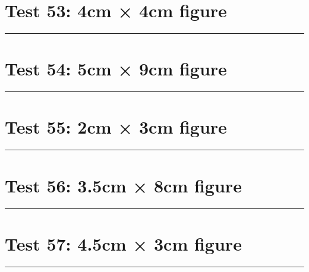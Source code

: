 \documentclass[a4paper,11pt]{article}
\begin{document}
\section*{Test 53: 4cm × 4cm figure}
\begin{swarmwrap}%
  \begin{minipage}[t]{4cm}
    \centering
    \rule{\linewidth}{4cm}
  \end{minipage}%
\end{swarmwrap}%
\swarmwrapnext
\lipsum[64]
\lipsum[65]
\lipsum[66]
\lipsum[67]
\lipsum[68]
\lipsum[69]
\section*{Test 54: 5cm × 9cm figure}
\begin{swarmwrap}%
  \begin{minipage}[t]{5cm}
    \centering
    \rule{\linewidth}{9cm}
  \end{minipage}%
\end{swarmwrap}%
\swarmwrapnext
\lipsum[50]
\lipsum[51]
\lipsum[52]
\lipsum[53]
\lipsum[54]
\lipsum[55]
\section*{Test 55: 2cm × 3cm figure}
\begin{swarmwrap}%
  \begin{minipage}[t]{2cm}
    \centering
    \rule{\linewidth}{3cm}
  \end{minipage}%
\end{swarmwrap}%
\swarmwrapnext
\lipsum[92]
\lipsum[93]
\lipsum[94]
\lipsum[95]
\lipsum[96]
\lipsum[97]
\section*{Test 56: 3.5cm × 8cm figure}
\begin{swarmwrap}%
  \begin{minipage}[t]{3cm}
    \centering
    \rule{\linewidth}{8cm}
  \end{minipage}%
\end{swarmwrap}%
\swarmwrapnext
\lipsum[15]
\lipsum[16]
\lipsum[17]
\lipsum[18]
\lipsum[19]
\lipsum[20]
\section*{Test 57: 4.5cm × 3cm figure}
\begin{swarmwrap}%
  \begin{minipage}[t]{4cm}
    \centering
    \rule{\linewidth}{3cm}
  \end{minipage}%
\end{swarmwrap}%
\swarmwrapnext
\lipsum[105]
\lipsum[106]
\lipsum[107]
\end{document}
